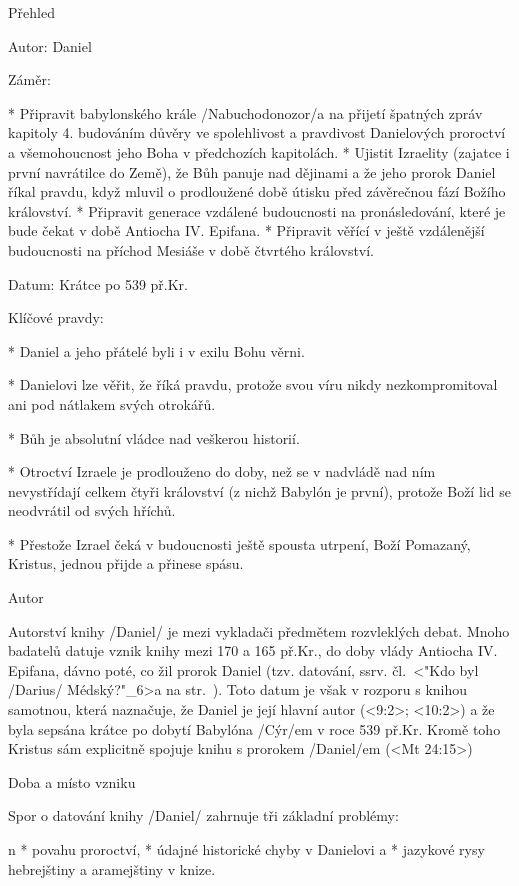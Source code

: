 Přehled

Autor: Daniel

Záměr:

\begitems
* Připravit babylonského krále \x/Nabuchodonozor/a na přijetí špatných zpráv kapitoly 4. budováním důvěry ve spolehlivost a pravdivost Danielových proroctví a všemohoucnost jeho Boha v předchozích kapitolách. 
* Ujistit Izraelity (zajatce i první navrátilce do Země), že Bůh panuje nad dějinami a že jeho prorok Daniel říkal pravdu, když mluvil o prodloužené době útisku před závěrečnou fází Božího království. 
* Připravit generace vzdálené budoucnosti na pronásledování, které je bude čekat v době Antiocha IV. Epifana.
* Připravit věřící v ještě vzdálenější budoucnosti na příchod Mesiáše v době čtvrtého království.
\enditems 


Datum: Krátce po 539 př.Kr.

Klíčové pravdy:

\begitems
* Daniel a jeho přátelé byli i v exilu Bohu věrni.

* Danielovi lze věřit, že říká pravdu, protože svou víru nikdy nezkompromitoval ani pod nátlakem svých otrokářů.

* Bůh je absolutní vládce nad veškerou historií.

* Otroctví Izraele je prodlouženo do doby, než se v nadvládě nad ním nevystřídají celkem čtyři  království (z nichž Babylón je první), protože Boží lid se neodvrátil od svých hříchů. 

* Přestože Izrael čeká v budoucnosti ještě spousta utrpení, Boží Pomazaný, Kristus, jednou přijde a přinese spásu.

\enditems

Autor

Autorství knihy \x/Daniel/ je mezi vykladači předmětem rozvleklých debat.
Mnoho badatelů datuje vznik knihy mezi 170 a 165 př.Kr., do doby vlády Antiocha IV. Epifana, dávno poté, co žil prorok Daniel (tzv.  datování, ssrv. čl.~<"Kdo byl \x/Darius/ Médský?"_6>a na str.~\pg). 
Toto datum je však v rozporu s knihou samotnou, která naznačuje, že Daniel je její hlavní autor (<9:2>; <10:2>) a že byla sepsána krátce po dobytí Babylóna \x/Cýr/em v roce 539 př.Kr. Kromě toho  Kristus sám explicitně spojuje knihu s prorokem \x/Daniel/em (<Mt 24:15>) 

Doba a místo vzniku

Spor o datování knihy \x/Daniel/ zahrnuje tři základní problémy:

\begitems \style n
* povahu proroctví,
* údajné historické chyby v Danielovi a 
* jazykové rysy hebrejštiny a aramejštiny v knize.
\enditems

